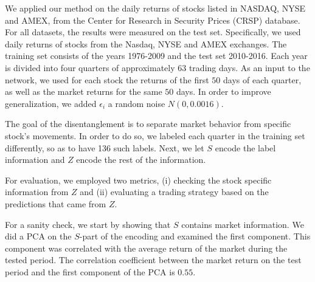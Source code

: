 \documentclass[10pt,twocolumn,letterpaper]{article}
\begin{document}

We applied our method on the daily returns of stocks listed in NASDAQ, NYSE and AMEX, from the Center for Research in Security Prices (CRSP) database. For all datasets, the results were measured on the test set. Specifically, we used daily returns of stocks from the Nasdaq, NYSE and AMEX exchanges. The training set consists of the years 1976-2009 and the test set 2010-2016. Each year is divided into four quarters of approximately $63$ trading days. As an input to the network, we used for each stock the returns of the first $50$ days of each quarter, as well as the  market returns for the same $50$ days. In order to improve generalization, we added $\epsilon_i$ a random noise $N(0,0.0016)$.

The goal of the disentanglement is to separate market behavior from specific stock's movements. In order to do so, we labeled each quarter in the training set differently, so as to have 136 such labels. Next, we let $S$ encode the label information and $Z$ encode  the rest of the information. %



For evaluation, we employed two metrics, (i) checking the stock specific information from $Z$ and (ii) evaluating a trading strategy based on the predictions that came from $Z$. 

For a sanity check, we start by showing that $S$ contains market information. We did a PCA on the $S$-part of the encoding and examined the first component. This component was correlated with the average return of the market during the tested period. The correlation coefficient between the market return on the test period and the first component of the PCA is $0.55$.   
\end{document}
